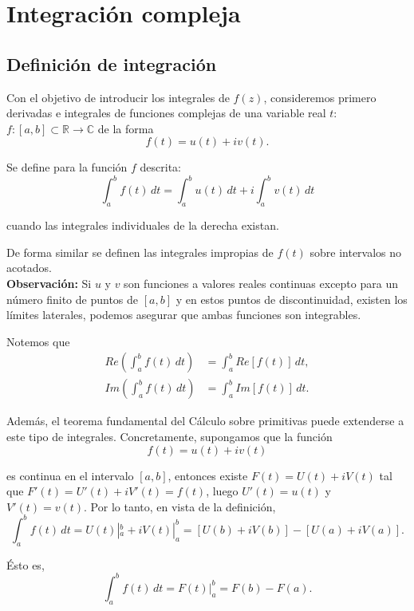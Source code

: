 \chapter{Integración compleja}

\section{Definición de integración}

Con el objetivo de introducir los integrales de $f(z)$, consideremos primero derivadas e integrales de funciones complejas de una variable real $t$: $f: [a,b] \subset \mathbb{R} \longrightarrow \mathbb{C}$ de la forma
$$f(t) = u(t) + i v(t).$$

\begin{defi}
Se define  para la función $f$ descrita:
$$\int_a^b f(t) \,dt = \int_a^b u(t) \,dt + i \int_a^b v(t) \,dt$$

cuando las integrales individuales de la derecha existan.
\end{defi}

De forma similar se definen las integrales impropias de $f(t)$ sobre intervalos no acotados.
\\

\textbf{Observación:} Si $u$ y $v$ son funciones a valores reales continuas excepto para un número finito de puntos de $[a,b]$ y en estos puntos de discontinuidad, existen los límites laterales, podemos asegurar que ambas funciones son integrables.

Notemos que 
\begin{align*}
Re\left(  \int_a^b f(t) \,dt \right) &= \int_a^b Re[f(t)] \,dt, \\
Im\left(  \int_a^b f(t) \,dt \right) &= \int_a^b Im[f(t)] \,dt.
\end{align*}

Además, el teorema fundamental del Cálculo sobre primitivas puede extenderse a este tipo de integrales. Concretamente, supongamos que la función
$$f(t) = u(t) + i v(t)$$

es continua en el intervalo $[a,b]$, entonces existe $F(t) = U(t) + i V(t)$ tal que $F'(t) = U'(t) + i V'(t) = f(t)$, luego $U'(t) = u(t)$ y $V'(t) = v(t)$. Por lo tanto, en vista de la definición,
$$\int_a^b f(t) \,dt = U(t)|_a^b + i V(t)|_a^b = [U(b) + iV(b)] - [U(a) + iV(a)].$$

Ésto es,
$$\int_a^b f(t) \,dt = F(t) |_a^b = F(b) - F(a).$$

